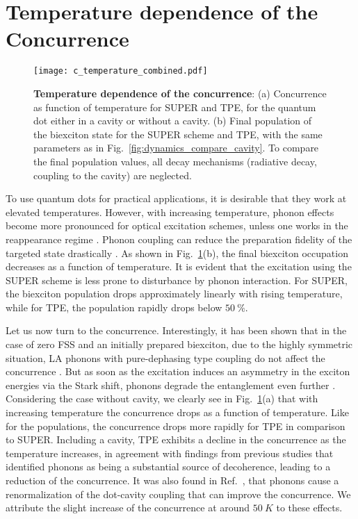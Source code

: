 \documentclass[%
 reprint,superscriptaddress,
 amsmath,amssymb,
 aps]{revtex4-2}
\begin{document}
\section{Temperature dependence of the Concurrence}
\begin{figure}[t]
    \centering
    \texttt{[image: c\_temperature\_combined.pdf]}\\
    \caption{\textbf{Temperature dependence of the concurrence}: (a) Concurrence as function of temperature for SUPER and TPE, for the quantum dot either in a cavity or without a cavity.
    (b) Final population of the biexciton state for the SUPER scheme and TPE, with the same parameters as in Fig.~\ref{fig:dynamics_compare_cavity}. To compare the final population values, all decay mechanisms (radiative decay, coupling to the cavity) are neglected.
    }
    \label{fig:temperature_dependence}
\end{figure}

To use quantum dots for practical applications, it is desirable that they work at elevated temperatures. However, with increasing temperature, phonon effects become more pronounced for optical excitation schemes, unless one works in the reappearance regime \cite{vagov2007nonmonotonic,reiter2019distinctive,kaldewey2017demonstrating,vannucci2022phonon}. Phonon coupling can reduce the preparation fidelity of the targeted state drastically \cite{ramsay2010phonon,luker2019review}. As shown in Fig.~\ref{fig:temperature_dependence}(b), the final biexciton occupation decreases as a function of temperature. It is evident that the excitation using the SUPER scheme is less prone to disturbance by phonon interaction. For SUPER, the biexciton population drops approximately linearly with rising temperature, while for TPE, the population rapidly drops below $\SI{50}{\percent}$.

Let us now turn to the concurrence. Interestingly, it has been shown that in the case of zero FSS and an initially prepared biexciton, due to the highly symmetric situation, LA phonons with pure-dephasing type coupling do not affect the concurrence \cite{carmele, seidelmann2019from}. But as soon as the excitation induces an asymmetry in the exciton energies via the Stark shift, phonons degrade the entanglement even further \cite{Seidelmann2023}. Considering the case without cavity, we clearly see in Fig.~\ref{fig:temperature_dependence}(a) that with increasing temperature the concurrence drops as a function of temperature. Like for the populations, the concurrence drops more rapidly for TPE in comparison to SUPER. Including a cavity, TPE exhibits a decline in the concurrence as the temperature increases, in agreement with findings from previous studies \cite{heinze2017polarization,seidelmann2019from} that identified phonons as being a substantial source of decoherence, leading to a reduction of the concurrence. It was also found in Ref.~\cite{seidelmann2019phonon}, that phonons cause a renormalization of the dot-cavity coupling that can improve the concurrence. We attribute the slight increase of the concurrence at around $\SI{50}{K}$ to these effects.
\end{document}
